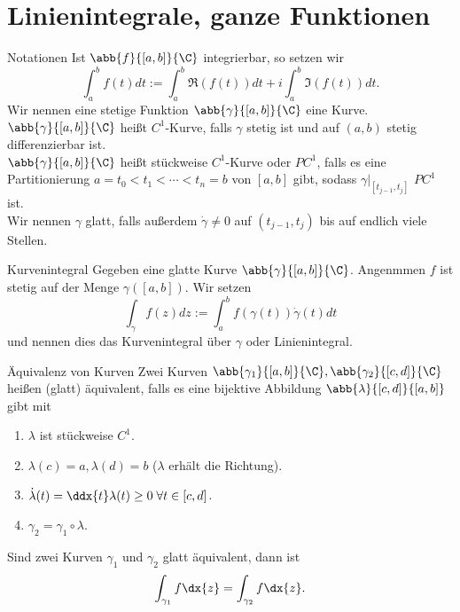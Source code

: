 

\section{Linienintegrale, ganze Funktionen}

\begin{karte}{Notationen}
    Ist \(\abb{f}{[a,b]}{\C}\) integrierbar, so setzen wir 
    \[ \int_a^b f(t) dt := \int_a^b \Re(f(t)) dt + i \int_a^b \Im(f(t)) dt. \]
    Wir nennen eine stetige Funktion \( \abb{\gamma}{[a,b]}{\C} \) eine Kurve. \\
    \(\abb{\gamma}{[a,b]}{\C}\) heißt \(C^1\)-Kurve, falls \(\gamma\) stetig ist und auf 
    \((a,b)\) stetig differenzierbar ist.\\
    \(\abb{\gamma}{[a,b]}{\C}\) heißt stückweise \(C^1\)-Kurve oder \(PC^1\), 
    falls es eine Partitionierung \(a = t_0 < t_1 < \cdots < t_n = b\) von 
    \([a,b]\) gibt, sodass \(\gamma|_{[t_{j-1}, t_j]}\) \(PC^1\) ist.\\
    Wir nennen \(\gamma\) glatt, falls außerdem \(\dot{\gamma} \neq 0\) auf \((t_{j-1}, t_j)\) bis auf 
    endlich viele Stellen.
\end{karte}

\begin{karte}{Kurvenintegral}
    Gegeben eine glatte Kurve \( \abb{\gamma}{[a,b]}{\C} \). Angenmmen \(f\) ist stetig 
    auf der Menge \(\gamma([a,b])\). Wir setzen 
    \[ \int_\gamma f(z) dz := \int_a^b f(\gamma(t))\dot{\gamma}(t) dt \]
    und nennen dies das Kurvenintegral über \(\gamma\) oder Linienintegral.
\end{karte}

\begin{karte}{Äquivalenz von Kurven}
    Zwei Kurven \( \abb{\gamma_1}{[a,b]}{\C}, \abb{\gamma_2}{[c,d]}{\C} \) heißen 
    (glatt) äquivalent, falls es eine bijektive Abbildung \(\abb{\lambda}{[c,d]}{[a,b]}\) gibt mit 
    \begin{enumerate}
        \item \(\lambda\) ist stückweise \(C^1\).
        \item \(\lambda(c) = a, \lambda(d) = b\) (\(\lambda\) erhält die Richtung).
        \item \(\dot{\lambda}(t) = \ddx{t} \lambda(t) \geq 0 \;\forall t\in [c,d]\).
        \item \( \gamma_2 = \gamma_1 \circ \lambda \).
    \end{enumerate}
    Sind zwei Kurven \(\gamma_1\) und \(\gamma_2\) glatt äquivalent, dann ist 
    \[ \int_{\gamma_1} f \dx{z} = \int_{\gamma_2} f \dx{z}. \]
\end{karte}

